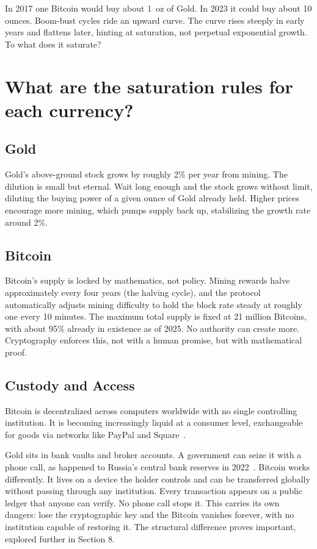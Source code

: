 \documentclass[11pt,letterpaper]{article}
\begin{document}
In 2017 one Bitcoin would buy about 1~oz of Gold. In 2023 it could buy about 10 ounces. Boom-bust cycles ride an upward curve. The curve rises steeply in early years and flattens later, hinting at saturation, not perpetual exponential growth. To what does it saturate?

\section{What are the saturation rules for each currency?}

\subsection{Gold}

Gold's above-ground stock grows by roughly 2\% per year from mining. The dilution is small but eternal. Wait long enough and the stock grows without limit, diluting the buying power of a given ounce of Gold already held. Higher prices encourage more mining, which pumps supply back up, stabilizing the growth rate around 2\%.

\subsection{Bitcoin}

Bitcoin's supply is locked by mathematics, not policy. Mining rewards halve approximately every four years (the halving cycle), and the protocol automatically adjusts mining difficulty to hold the block rate steady at roughly one every 10 minutes. The maximum total supply is fixed at 21 million Bitcoins, with about 95\% already in existence as of 2025. No authority can create more. Cryptography enforces this, not with a human promise, but with mathematical proof.

\subsection{Custody and Access}

Bitcoin is decentralized across computers worldwide with no single controlling institution. It is becoming increasingly liquid at a consumer level, exchangeable for goods via networks like PayPal and Square~\cite{square2025}.

Gold sits in bank vaults and broker accounts. A government can seize it with a phone call, as happened to Russia's central bank reserves in 2022~\cite{cnbc2022}. Bitcoin works differently. It lives on a device the holder controls and can be transferred globally without passing through any institution. Every transaction appears on a public ledger that anyone can verify. No phone call stops it. This carries its own dangers: lose the cryptographic key and the Bitcoin vanishes forever, with no institution capable of restoring it. The structural difference proves important, explored further in Section 8.
\end{document}
